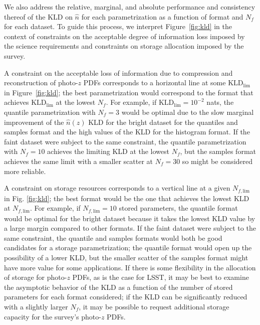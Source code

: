 \documentclass[\docopts]{\docclass}
\newcommand{\pz}{photo-$z$ PDF}
\newcommand{\mgdata}{bright\xspace}
\newcommand{\ssdata}{faint\xspace}
\begin{document}
We also address the relative, marginal, and absolute performance and 
consistency thereof of the KLD on $\hat{n}$ for each parametrization as a 
function of format and $N_{f}$ for each dataset.
To guide this process, we interpret Figure~\ref{fig:kld} in the context of 
constraints on the acceptable degree of information loss imposed by the science 
requirements and constraints on storage allocation imposed by the survey.

A constraint on the acceptable loss of information due to compression and 
reconstruction of \pz s corresponds to a horizontal line at some 
$\mathrm{KLD}_{\mathrm{lim}}$ in Figure~\ref{fig:kld}; the best parametrization 
would correspond to the format that achieves $\mathrm{KLD}_{\mathrm{lim}}$ at 
the lowest $N_{f}$.
For example, if $\mathrm{KLD}_{\mathrm{lim}}=10^{-2}$ nats, the quantile 
parametrization with $N_{f}=3$ would be optimal due to the slow marginal 
improvement of the $\hat{n}(z)$ KLD for the \mgdata dataset for the quantiles 
and samples format and the high values of the KLD for the histogram format.
If the \ssdata dataset were subject to the same constraint, the quantile 
parametrization with $N_{f}=10$ achieves the limiting KLD at the lowest 
$N_{f}$, but the samples format achieves the same limit with a smaller scatter 
at $N_{f}=30$ so might be considered more reliable.

A constraint on storage resources corresponds to a vertical line at a given 
$N_{f, \mathrm{lim}}$ in Fig. \ref{fig:kld}; the best format would be the one 
that achieves the lowest KLD at $N_{f, \mathrm{lim}}$.
For example, if $N_{f, \mathrm{lim}}=10$ stored parameters, the quantile format 
would be optimal for the \mgdata dataset because it takes the lowest KLD value 
by a large margin compared to other formats.
If the \ssdata dataset were subject to the same constraint, the quantile and 
samples formats would both be good candidates for a storage parametrization; 
the quantile format would open up the possibility of a lower KLD, but the 
smaller scatter of the samples format might have more value for some 
applications.
If there is some flexibility in the allocation of storage for \pz s, as is the 
case for LSST, it may be best to examine the asymptotic behavior of the KLD as 
a function of the number of stored parameters for each format considered; if 
the KLD can be significantly reduced with a slightly larger $N_{f}$, it may be 
possible to request additional storage capacity for the survey's \pz s.
\end{document}
